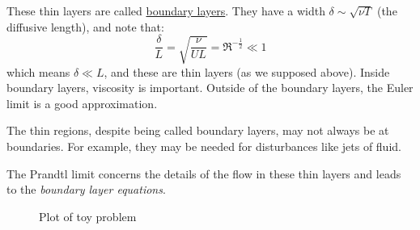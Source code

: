 \documentclass[../Main.tex]{subfiles}
\begin{document}
These thin layers are called \underline{boundary layers}. They have a width $\delta \sim \sqrt{\nu T}$ (the diffusive length), and note that:
\begin{equation*}
    \frac{\delta}{L} = \sqrt{\frac{\nu}{UL}} = \Re^{-\frac12} \ll 1
\end{equation*}
which means $\delta \ll L$, and these are thin layers (as we supposed above). Inside boundary layers, viscosity is important. Outside of the boundary layers, the Euler limit is a good approximation.

\begin{warning}
    The thin regions, despite being called boundary layers, may not always be at boundaries. For example, they may be needed for disturbances like jets of fluid.
\end{warning}

The Prandtl limit concerns the details of the flow in these thin layers and leads to the \textit{boundary layer equations}.

\begin{figure}
    \centering
    \caption{Plot of toy problem}
    \label{figToyProblem}
\end{figure}
\end{document}
